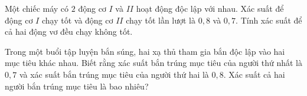 \begin{bt}%
	Một chiếc máy có $2$ động cơ $I$ và $II$ hoạt động độc lập với nhau. Xác suất để động cơ $I$ chạy tốt và động cơ $II$ chạy tốt lần lượt là $0{,}8$ và $0{,}7$. Tính xác suất để cả hai động vơ đều chạy không tốt.
\end{bt}

\begin{bt}%
	Trong một buổi tập luyện bắn súng, hai xạ thủ tham gia bắn độc lập vào hai mục tiêu khác nhau. Biết rằng xác suất bắn trúng mục tiêu của người thứ nhất là $0{,}7$ và xác suất bắn trúng mục tiêu của người thứ hai là $0{,}8$. Xác suất cả hai người bắn trúng mục tiêu là bao nhiêu?
\end{bt}

